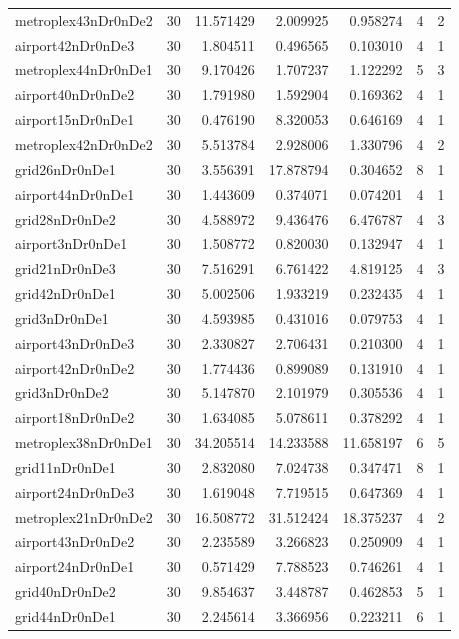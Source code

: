 \documentclass[../../../thesis.tex]{subfiles}
\begin{document}
\begin{longtable}{|l|r|r|r|r|r|r|}
metroplex43nDr0nDe2 & 30 & 11.571429 & 2.009925 & 0.958274 & 4 & 2 \\
airport42nDr0nDe3 & 30 & 1.804511 & 0.496565 & 0.103010 & 4 & 1 \\
metroplex44nDr0nDe1 & 30 & 9.170426 & 1.707237 & 1.122292 & 5 & 3 \\
airport40nDr0nDe2 & 30 & 1.791980 & 1.592904 & 0.169362 & 4 & 1 \\
airport15nDr0nDe1 & 30 & 0.476190 & 8.320053 & 0.646169 & 4 & 1 \\
metroplex42nDr0nDe2 & 30 & 5.513784 & 2.928006 & 1.330796 & 4 & 2 \\
grid26nDr0nDe1 & 30 & 3.556391 & 17.878794 & 0.304652 & 8 & 1 \\
airport44nDr0nDe1 & 30 & 1.443609 & 0.374071 & 0.074201 & 4 & 1 \\
grid28nDr0nDe2 & 30 & 4.588972 & 9.436476 & 6.476787 & 4 & 3 \\
airport3nDr0nDe1 & 30 & 1.508772 & 0.820030 & 0.132947 & 4 & 1 \\
grid21nDr0nDe3 & 30 & 7.516291 & 6.761422 & 4.819125 & 4 & 3 \\
grid42nDr0nDe1 & 30 & 5.002506 & 1.933219 & 0.232435 & 4 & 1 \\
grid3nDr0nDe1 & 30 & 4.593985 & 0.431016 & 0.079753 & 4 & 1 \\
airport43nDr0nDe3 & 30 & 2.330827 & 2.706431 & 0.210300 & 4 & 1 \\
airport42nDr0nDe2 & 30 & 1.774436 & 0.899089 & 0.131910 & 4 & 1 \\
grid3nDr0nDe2 & 30 & 5.147870 & 2.101979 & 0.305536 & 4 & 1 \\
airport18nDr0nDe2 & 30 & 1.634085 & 5.078611 & 0.378292 & 4 & 1 \\
metroplex38nDr0nDe1 & 30 & 34.205514 & 14.233588 & 11.658197 & 6 & 5 \\
grid11nDr0nDe1 & 30 & 2.832080 & 7.024738 & 0.347471 & 8 & 1 \\
airport24nDr0nDe3 & 30 & 1.619048 & 7.719515 & 0.647369 & 4 & 1 \\
metroplex21nDr0nDe2 & 30 & 16.508772 & 31.512424 & 18.375237 & 4 & 2 \\
airport43nDr0nDe2 & 30 & 2.235589 & 3.266823 & 0.250909 & 4 & 1 \\
airport24nDr0nDe1 & 30 & 0.571429 & 7.788523 & 0.746261 & 4 & 1 \\
grid40nDr0nDe2 & 30 & 9.854637 & 3.448787 & 0.462853 & 5 & 1 \\
grid44nDr0nDe1 & 30 & 2.245614 & 3.366956 & 0.223211 & 6 & 1 \\

\end{longtable}
\end{document}
